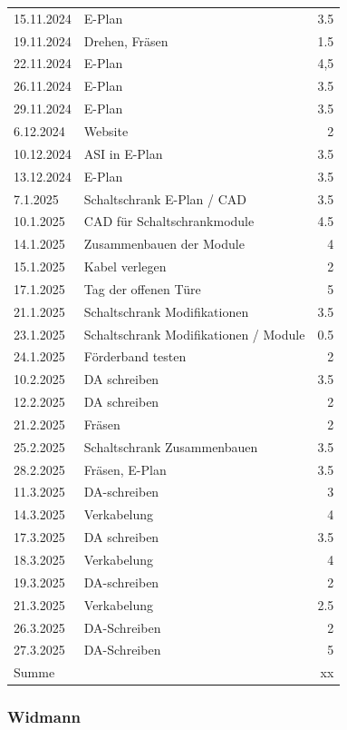\begin{longtable}{|l|p{10cm}|r|}
15.11.2024	&	E-Plan	&	3.5	\\
19.11.2024	&	Drehen, Fräsen	&	1.5	\\
22.11.2024	&	E-Plan	&	4,5	\\
26.11.2024	&	E-Plan	&	3.5	\\
29.11.2024	&	E-Plan	&	3.5	\\
6.12.2024	&	Website	&	2	\\
10.12.2024	&	ASI in E-Plan	&	3.5	\\
13.12.2024	&	E-Plan 	&	3.5	\\
7.1.2025	&	Schaltschrank E-Plan / CAD	&	3.5	\\
10.1.2025	&	CAD für Schaltschrankmodule	&	4.5	\\
14.1.2025	&	Zusammenbauen der Module	&	4	\\
15.1.2025	&	Kabel verlegen	&	2	\\
17.1.2025	&	Tag der offenen Türe	&	5	\\
21.1.2025	&	Schaltschrank Modifikationen	&	3.5	\\
23.1.2025	&	Schaltschrank Modifikationen / Module	&	0.5	\\
24.1.2025	&	 Förderband testen	&	2	\\
10.2.2025	&	DA schreiben	&	3.5	\\
12.2.2025	&	DA schreiben	&	2	\\
21.2.2025	&	Fräsen	&	2	\\
25.2.2025	&	Schaltschrank Zusammenbauen	&	3.5	\\
28.2.2025	&	Fräsen, E-Plan	&	3.5	\\
11.3.2025	&	DA-schreiben	&	3	\\
14.3.2025	&	Verkabelung	&	4	\\
17.3.2025	&	DA schreiben	&	3.5	\\
18.3.2025	&	Verkabelung	&	4	\\
19.3.2025	&	DA-schreiben 	&	2	\\
21.3.2025	&	Verkabelung	&	2.5	\\
26.3.2025	&	DA-Schreiben	&	2	\\
27.3.2025 &	DA-Schreiben	&	5	\\

\hline
\hline
Summe & & xx \\

\end{longtable}
\newpage

\subsubsection{Widmann}

